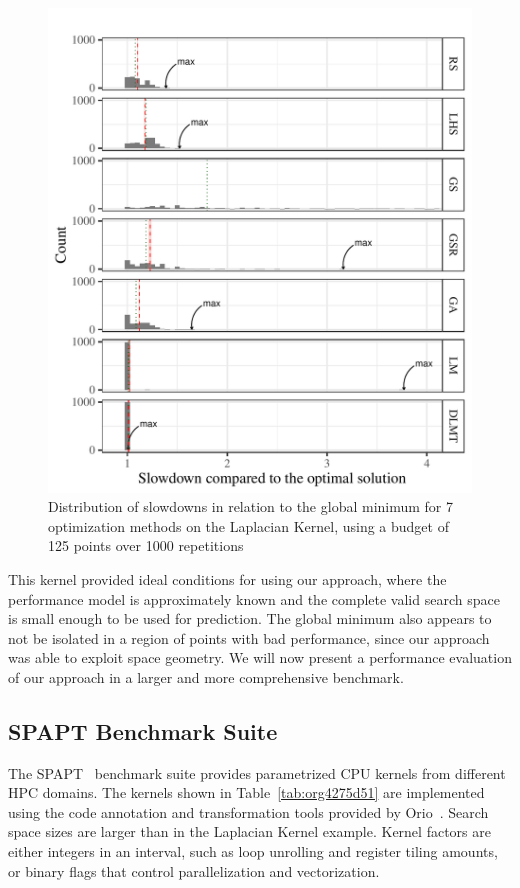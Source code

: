 \documentclass[conference]{IEEEtran}
\begin{document}
\begin{figure}[t]\vspace{-.5cm}
\centering
\includegraphics[width=.9\columnwidth]{./img/comparison_histogram.pdf}
\caption{\label{fig:orgd78027d}
Distribution of slowdowns in relation to the global minimum for 7 optimization methods on the Laplacian Kernel, using a budget of 125 points over 1000 repetitions \vspace{-.5cm}}
\end{figure}

This kernel provided ideal conditions for using our approach, where the
performance model is approximately known and the complete valid search space is
small enough to be used for prediction. The global minimum also appears to not
be isolated in a region of points with bad performance, since our approach was
able to exploit space geometry. We will now present a performance evaluation of
our approach in a larger and more comprehensive benchmark.
\subsection{SPAPT Benchmark Suite}
\label{sec:org539b9cd}
The SPAPT~\cite{balaprakash2012spapt} benchmark suite provides
parametrized CPU kernels from different HPC domains. The kernels shown in
Table~\ref{tab:org4275d51} are implemented using the code annotation and
transformation tools provided by Orio~\cite{hartono2009annotation}. Search
space sizes are larger than in the Laplacian Kernel example. Kernel factors are
either integers in an interval, such as loop unrolling and register tiling
amounts, or binary flags that control parallelization and vectorization.
\end{document}
